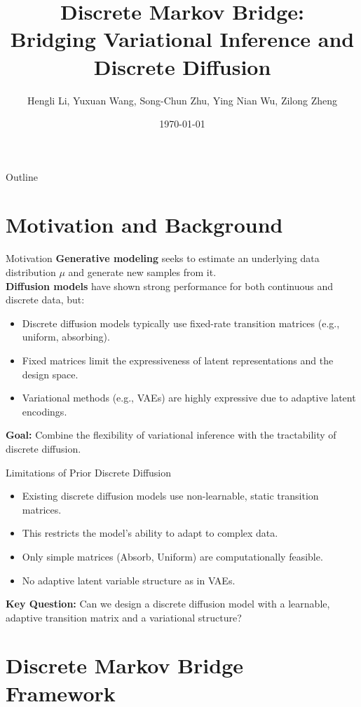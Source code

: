 \documentclass{beamer}
\title{Discrete Markov Bridge:\\ Bridging Variational Inference and Discrete Diffusion}
\author{Hengli Li, Yuxuan Wang, Song-Chun Zhu, Ying Nian Wu, Zilong Zheng}
\institute{Peking University, Beijing Institute for General AI, UCLA}
\date{\today}
\begin{document}
\begin{frame}
  \titlepage
\end{frame}

\begin{frame}{Outline}
  \tableofcontents
\end{frame}

\section{Motivation and Background}

\begin{frame}{Motivation}
  \textbf{Generative modeling} seeks to estimate an underlying data distribution $\mu$ and generate new samples from it.\\[1em]
  \textbf{Diffusion models} have shown strong performance for both continuous and discrete data, but:
  \begin{itemize}
    \item Discrete diffusion models typically use fixed-rate transition matrices (e.g., uniform, absorbing).
    \item Fixed matrices limit the expressiveness of latent representations and the design space.
    \item Variational methods (e.g., VAEs) are highly expressive due to adaptive latent encodings.
  \end{itemize}
  \textbf{Goal:} Combine the flexibility of variational inference with the tractability of discrete diffusion.
\end{frame}

\begin{frame}{Limitations of Prior Discrete Diffusion}
  \begin{itemize}
    \item Existing discrete diffusion models use non-learnable, static transition matrices.
    \item This restricts the model’s ability to adapt to complex data.
    \item Only simple matrices (Absorb, Uniform) are computationally feasible.
    \item No adaptive latent variable structure as in VAEs.
  \end{itemize}
  \textbf{Key Question:} Can we design a discrete diffusion model with a learnable, adaptive transition matrix and a variational structure?
\end{frame}

\section{Discrete Markov Bridge Framework}
\end{document}
